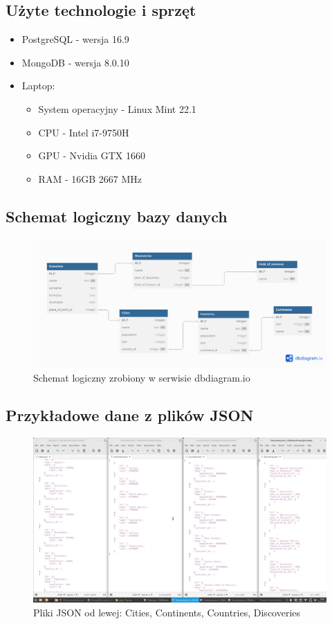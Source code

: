 \documentclass[11pt]{article}
\begin{document}
	\subsection{Użyte technologie i sprzęt}
		\begin{itemize}
			\item PostgreSQL - wersja 16.9
			\item MongoDB - wersja 8.0.10
			\item Laptop:
			\begin{itemize}
				\item System operacyjny - Linux Mint 22.1
				\item CPU - Intel i7-9750H
				\item GPU - Nvidia GTX 1660
				\item RAM - 16GB 2667 MHz		
			\end{itemize}
		\end{itemize}
	
\newpage
	\subsection{Schemat logiczny bazy danych}
		\begin{figure}[h]
			\includegraphics[width=\textwidth]{db-bench.png}
			\caption{Schemat logiczny zrobiony w serwisie dbdiagram.io}
		\end{figure}
	\subsection{Przykładowe dane z plików JSON}
		\begin{figure}[h]
			\includegraphics[width=\textwidth]{JSON_examples_1.png}
			\caption{Pliki JSON od lewej: Cities, Continents, Countries, Discoveries}
		\end{figure}
\end{document}
